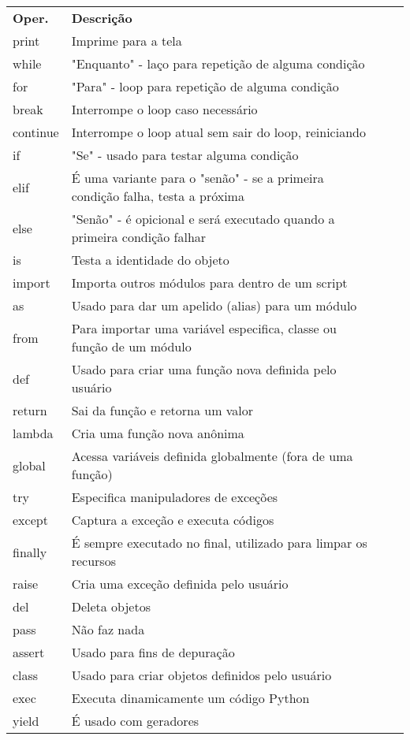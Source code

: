 \documentclass[landscape,a0paper,fontscale=0.285]{baposter} %
\begin{document}
\begin{poster}
{\colorbox[HTML]{CCFFFF}{}
\begin{tabular}{lp{5.8cm}lp{1.0cm}}
{\bf Oper.} & {\bf Descrição}\\
print & Imprime para a tela \\
while & "Enquanto" - laço para repetição de alguma condição \\
for & "Para" - loop para repetição de alguma condição \\
break & Interrompe o loop caso necessário \\
continue & Interrompe o loop atual sem sair do loop, reiniciando \\
if & "Se" - usado para testar alguma condição \\
elif & É uma variante para o "senão" - se a primeira condição falha, testa a próxima \\
else & "Senão" - é opicional e será executado quando a primeira condição falhar \\
is & Testa a identidade do objeto \\
import & Importa outros módulos para dentro de um script \\
as & Usado para dar um apelido (alias) para um módulo \\
from & Para importar uma variável especifica, classe ou função de um módulo \\
def & Usado para criar uma função nova definida pelo usuário \\
return & Sai da função e retorna um valor \\
lambda & Cria uma função nova anônima \\
global & Acessa variáveis definida globalmente (fora de uma função) \\
try & Especifica manipuladores de exceções  \\
except & Captura a exceção e executa códigos \\
finally & É sempre executado no final, utilizado para limpar os recursos \\
raise & Cria uma exceção definida pelo usuário \\
del & Deleta objetos \\
pass & Não faz nada \\
assert & Usado para fins de depuração \\
class & Usado para criar objetos definidos pelo usuário \\
exec & Executa dinamicamente um código Python \\
yield & É usado com geradores
\end{tabular}


}
\end{poster}
\end{document}
